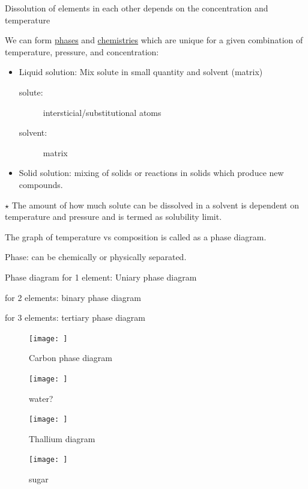 \documentclass{article}
\begin{document}
Dissolution of elements in each other depends on the concentration and temperature

We can form \underline{phases} and \underline{chemistries} which are unique for a given combination of temperature, pressure, and concentration:

\begin{itemize}
    \item Liquid solution: Mix solute in small quantity and solvent (matrix)
    \begin{description}
    \item[solute:] intersticial/substitutional atoms
    \item[solvent:] matrix
    \end{description}
    
    \item Solid solution: mixing of solids or reactions in solids which produce new compounds.
\end{itemize}

$\star$ The amount of how much solute can be dissolved in a solvent is dependent on temperature and pressure and is termed as solubility limit.

The graph of temperature vs composition is called as a phase diagram.

Phase: can be chemically or physically separated.

Phase diagram for 1 element: Uniary phase diagram

for 2 elements: binary phase diagram

for 3 elements: tertiary phase diagram

\begin{figure}[h!]
	\centering
	\texttt{[image: ]}
	\caption{Carbon phase diagram}
\end{figure}

\begin{figure}[h!]
    \centering
    \texttt{[image: ]}
    \caption{water?}
    \label{fig:my_label}
\end{figure}

\begin{figure}[h!]
    \centering
    \texttt{[image: ]}
    \caption{Thallium diagram}
    \label{fig:my_label}
\end{figure}

\begin{figure}[h!]
    \centering
    \texttt{[image: ]}
    \caption{sugar}
    \label{fig:my_label}
\end{figure}
\end{document}
